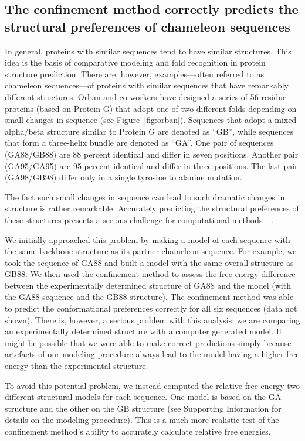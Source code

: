 \documentclass[12pt]{article}
\begin{document}
\subsection{The confinement method correctly predicts the structural preferences of chameleon
sequences}

In general, proteins with similar sequences tend to have similar structures. This idea is the basis
of comparative modeling and fold recognition in protein structure prediction. There are, however,
examples---often referred to as chameleon sequences---of proteins with similar sequences that have
remarkably different structures. Orban and co-workers have designed a series of 56-residue proteins
(based on Protein G) that adopt one of two different folds depending on small changes in sequence
(see Figure~\ref{fig:orban}). Sequences that adopt a mixed alpha/beta structure similar to Protein G
are denoted as ``GB'', while sequences that form a three-helix bundle are denoted as ``GA''. One
pair of sequences (GA88/GB88) are 88 percent identical and differ in seven positions. Another pair
(GA95/GA95) are 95 percent identical and differ in three positions. The last pair (GA98/GB98) differ
only in a single tyrosine to alanine mutation.

The fact such small changes in sequence can lead to such dramatic changes in structure is rather
remarkable. Accurately predicting the structural preferences of these structures presents a serious
challenge for computational methods \cite{Alexander2007}$-$\cite{Shortle20009}.

We initially approached this problem by making a model of each sequence with the same backbone
structure as its partner chameleon sequence. For example, we took the sequence of GA88 and built a
model with the same overall structure as GB88. We then used the confinement method to assess the
free energy difference between the experimentally determined structure of GA88 and the model (with
the GA88 sequence and the GB88 structure). The confinement method was able to predict the
conformational preferences correctly for all six sequences (data not shown). There is, however, a
serious problem with this analysis: we are comparing an experimentally determined structure with a
computer generated model. It might be possible that we were able to make correct predictions simply
because artefacts of our modeling procedure always lead to the model having a higher free energy
than the experimental structure.

To avoid this potential problem, we instead computed the relative free energy two different
structural models for each sequence. One model is based on the GA structure and the other on the GB
structure (see Supporting Information for details on the modeling procedure). This is a much more
realistic test of the confinement method's ability to accurately calculate relative free energies.
\end{document}
